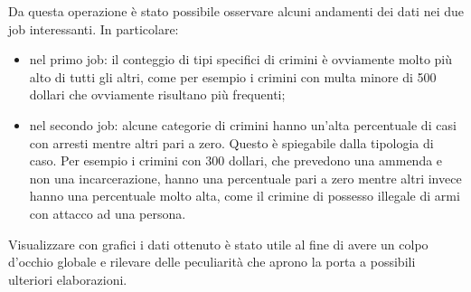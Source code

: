 \documentclass[10pt]{article}
\begin{document}
Da questa operazione è stato possibile osservare alcuni andamenti dei dati nei due job interessanti. In particolare:
\begin{itemize}
\item nel primo job: il conteggio di tipi specifici di crimini è ovviamente molto più alto di tutti gli altri, come per esempio i crimini con multa minore di 500 dollari che ovviamente risultano più frequenti;
\item nel secondo job: alcune categorie di crimini hanno un'alta percentuale di casi con arresti mentre altri pari a zero. Questo è spiegabile dalla tipologia di caso. Per esempio i crimini con 300 dollari, che prevedono una ammenda e non una incarcerazione, hanno una percentuale pari a zero mentre altri invece hanno una percentuale molto alta, come il crimine di possesso illegale di armi con attacco ad una persona.
\end{itemize}
Visualizzare con grafici i dati ottenuto è stato utile al fine di avere un colpo d'occhio globale e rilevare delle peculiarità che aprono la porta a possibili ulteriori elaborazioni.
\end{document}
